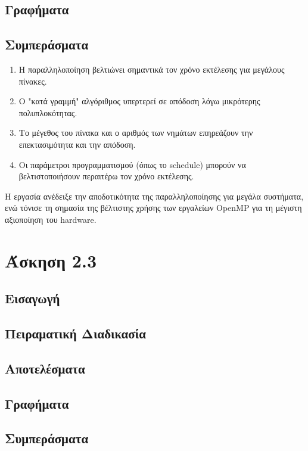\documentclass{article}
\begin{document}
\subsection*{Γραφήματα}
\subsection*{Συμπεράσματα}
\begin{enumerate}
    \item Η παραλληλοποίηση βελτιώνει σημαντικά τον χρόνο εκτέλεσης για μεγάλους πίνακες.
    \item Ο "κατά γραμμή" αλγόριθμος υπερτερεί σε απόδοση λόγω μικρότερης πολυπλοκότητας.
    \item Το μέγεθος του πίνακα και ο αριθμός των νημάτων επηρεάζουν την επεκτασιμότητα και την απόδοση.
    \item Οι παράμετροι προγραμματισμού (όπως το schedule) μπορούν να βελτιστοποιήσουν περαιτέρω τον χρόνο εκτέλεσης.
\end{enumerate}
Η εργασία ανέδειξε την αποδοτικότητα της παραλληλοποίησης για μεγάλα συστήματα, ενώ τόνισε τη σημασία της βέλτιστης χρήσης των εργαλείων OpenMP για τη μέγιστη αξιοποίηση του hardware.
\section*{Άσκηση 2.3}
\subsection*{Εισαγωγή}
\subsection*{Πειραματική Διαδικασία}
\subsection*{Αποτελέσματα}
\subsection*{Γραφήματα}
\subsection*{Συμπεράσματα}
\end{document}
